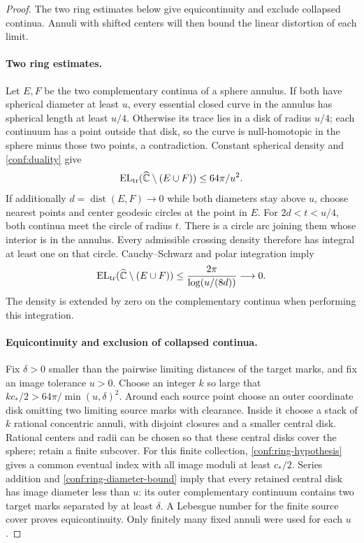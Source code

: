 \documentclass[11pt]{article}
\numberwithin{equation}{section}
\theoremstyle{definition}
\theoremstyle{remark}
\newcommand{\1}{\mathbf 1}
\begin{document}
\begin{proof}
The two ring estimates below give equicontinuity and exclude collapsed
continua.  Annuli with shifted centers will then bound the linear
distortion of each limit.

\paragraph{Two ring estimates.}
Let \(E,F\) be the two
complementary continua of a sphere annulus.  If both have spherical
diameter at least \(u\), every essential closed curve in the annulus
has spherical length at least \(u/4\).  Otherwise its trace lies
in a disk of radius \(u/4\); each continuum has a point outside
that disk, so the curve is null-homotopic in the sphere minus those
two points, a contradiction.  Constant spherical density and
\eqref{conf:duality} give
\begin{equation}
 \operatorname{EL}_{\rm tr}(\widehat{\mathbb C}\setminus(E\cup F))
       \le 64\pi/u^2.
 \label{conf:ring-diameter-bound}
\end{equation}
If additionally \(d=\operatorname{dist}(E,F)\to0\) while both diameters stay
above \(u\), choose nearest points and center geodesic circles at
the point in \(E\).  For \(2d<t<u/4\), both continua meet the
circle of radius \(t\).  There is a circle arc joining them whose
interior is in the annulus.  Every admissible crossing density
therefore has integral at least one on that circle.  Cauchy--Schwarz
and polar integration imply
\begin{equation}
 \operatorname{EL}_{\rm tr}(\widehat{\mathbb C}\setminus(E\cup F))
       \le \frac{2\pi}{\log(u/(8d))}\longrightarrow0.
 \label{conf:ring-touching-bound}
\end{equation}
The density is extended by zero on the complementary continua when
performing this integration.

\paragraph{Equicontinuity and exclusion of collapsed continua.}
Fix \(\delta>0\) smaller than the pairwise limiting distances of
the target marks, and fix an image tolerance \(u>0\).  Choose
an integer \(k\) so large that
\(kc_*/2>64\pi/\min(u,\delta)^2\).  Around each source point
choose an outer coordinate disk omitting two limiting source marks
with clearance.  Inside it choose a stack of \(k\) rational
concentric annuli, with disjoint closures and a smaller central
disk.  Rational centers and radii can be chosen so that these
central disks cover the sphere; retain a finite subcover.  For this
finite collection, \eqref{conf:ring-hypothesis} gives a common
eventual index with all image moduli at least \(c_*/2\).  Series
addition and \eqref{conf:ring-diameter-bound} imply that every
retained central disk has image diameter less than \(u\): its
outer complementary continuum contains two target marks separated
by at least \(\delta\).  A Lebesgue number for the finite source
cover proves equicontinuity.  Only finitely many fixed annuli were
used for each \(u\).


\end{proof}
\end{document}
